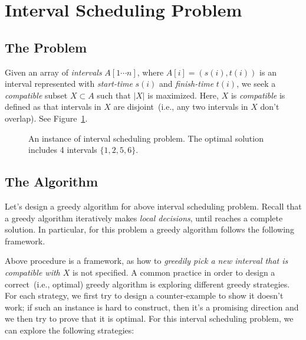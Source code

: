 \section{Interval Scheduling Problem}

\subsection*{The Problem}

Given an array of \emph{intervals} $A[1\cdots n]$, where $A[i] = (s(i),t(i))$ is an interval represented with
\emph{start-time} $s(i)$ and \emph{finish-time} $t(i)$, we seek a \emph{compatible} subset $X\subset A$
such that $|X|$ is maximized. Here, $X$ is \emph{compatible} is defined as that intervals in $X$
are disjoint~(i.e., any two intervals in $X$ don't overlap).
See Figure~\ref{fig:interval}.

\begin{figure}[h]
\centering{}
\caption{An instance of interval scheduling problem.
The optimal solution includes 4 intervals $\{1, 2, 5, 6\}$.}
\label{fig:interval}
\end{figure}

\subsection*{The Algorithm}

Let's design a greedy algorithm for above interval scheduling problem.
Recall that a greedy algorithm iteratively makes \emph{local decisions},
until reaches a complete solution. In particular, for this problem
a greedy algorithm follows the following framework.

\begin{minipage}{0.8\textwidth}
	\xxx
	\xxx
	\xxx
	\xxx
	\xxx
	\xxx
	\xxx
\end{minipage}

Above procedure is a framework, as how to \emph{greedily pick a new interval that is compatible with $X$} is not specified.
A common practice in order to design a correct~(i.e., optimal) greedy algorithm is
exploring different greedy strategies. For each strategy, we first try to
design a counter-example to show it doesn't work; if such an instance
is hard to construct, then it's a promising direction and we then try to prove that it is optimal.
For this interval scheduling problem, we can explore the following strategies:

